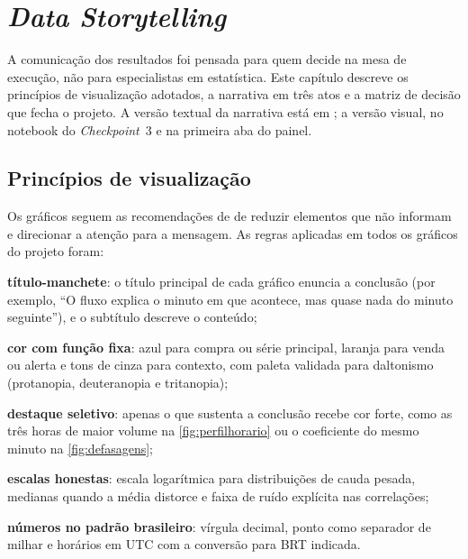 \chapter{\textit{Data Storytelling}}\label{cap:storytelling}

A comunicação dos resultados foi pensada para quem decide na mesa de execução,
não para especialistas em estatística. Este capítulo descreve os princípios de
visualização adotados, a narrativa em três atos e a matriz de decisão que fecha o
projeto. A versão textual da narrativa está em ; a versão
visual, no notebook do \textit{Checkpoint}~3 e na primeira aba do painel.

\section{Princípios de visualização}\label{sec:principios}

Os gráficos seguem as recomendações de  de reduzir
elementos que não informam e direcionar a atenção para a mensagem. As regras
aplicadas em todos os gráficos do projeto foram:

\begin{alineas}
  \item \textbf{título-manchete}: o título principal de cada gráfico enuncia a
        conclusão (por exemplo, ``O fluxo explica o minuto em que acontece, mas
        quase nada do minuto seguinte''), e o subtítulo descreve o conteúdo;
  \item \textbf{cor com função fixa}: azul para compra ou série principal,
        laranja para venda ou alerta e tons de cinza para contexto, com paleta
        validada para daltonismo (protanopia, deuteranopia e tritanopia);
  \item \textbf{destaque seletivo}: apenas o que sustenta a conclusão recebe cor
        forte, como as três horas de maior volume na
        \autoref{fig:perfilhorario} ou o coeficiente do mesmo minuto na
        \autoref{fig:defasagens};
  \item \textbf{escalas honestas}: escala logarítmica para distribuições de
        cauda pesada, medianas quando a média distorce e faixa de ruído
        explícita nas correlações;
  \item \textbf{números no padrão brasileiro}: vírgula decimal, ponto como
        separador de milhar e horários em UTC com a conversão para BRT
        indicada.
\end{alineas}

